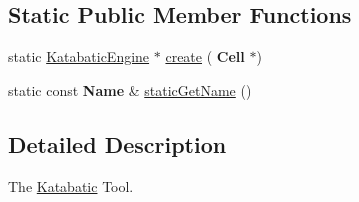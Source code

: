 \subsection*{Static Public Member Functions}
\begin{DoxyCompactItemize}
\item 
static \hyperlink{classKatabatic_1_1KatabaticEngine}{Katabatic\+Engine} $\ast$ \hyperlink{classKatabatic_1_1KatabaticEngine_ab877a64c314024602cfb04631ebfbfc4}{create} (\textbf{ Cell} $\ast$)
\item 
static const \textbf{ Name} \& \hyperlink{classKatabatic_1_1KatabaticEngine_a802eee6265da8d536db52d412f8a4afd}{static\+Get\+Name} ()
\end{DoxyCompactItemize}


\subsection{Detailed Description}
The \hyperlink{namespaceKatabatic}{Katabatic} Tool. 

